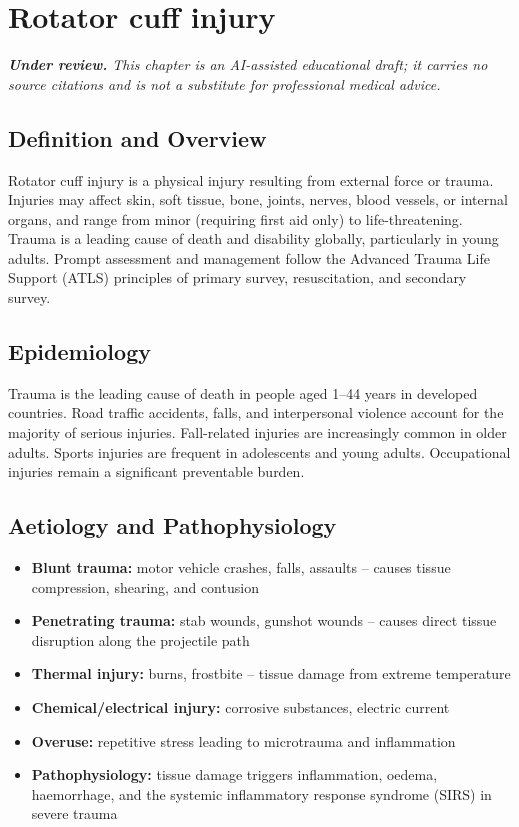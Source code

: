 \chapter{Rotator cuff injury}

\medskip
\noindent\textit{\textbf{Under review.} This chapter is an AI-assisted educational draft; it carries no source citations and is not a substitute for professional medical advice.}

\section*{Definition and Overview}
Rotator cuff injury is a physical injury resulting from external force or trauma. Injuries may affect skin, soft tissue, bone, joints, nerves, blood vessels, or internal organs, and range from minor (requiring first aid only) to life-threatening. Trauma is a leading cause of death and disability globally, particularly in young adults. Prompt assessment and management follow the Advanced Trauma Life Support (ATLS) principles of primary survey, resuscitation, and secondary survey.

\section*{Epidemiology}
Trauma is the leading cause of death in people aged 1--44 years in developed countries. Road traffic accidents, falls, and interpersonal violence account for the majority of serious injuries. Fall-related injuries are increasingly common in older adults. Sports injuries are frequent in adolescents and young adults. Occupational injuries remain a significant preventable burden.

\section*{Aetiology and Pathophysiology}
\begin{itemize}
    \item \textbf{Blunt trauma:} motor vehicle crashes, falls, assaults -- causes tissue compression, shearing, and contusion
    \item \textbf{Penetrating trauma:} stab wounds, gunshot wounds -- causes direct tissue disruption along the projectile path
    \item \textbf{Thermal injury:} burns, frostbite -- tissue damage from extreme temperature
    \item \textbf{Chemical/electrical injury:} corrosive substances, electric current
    \item \textbf{Overuse:} repetitive stress leading to microtrauma and inflammation
    \item \textbf{Pathophysiology:} tissue damage triggers inflammation, oedema, haemorrhage, and the systemic inflammatory response syndrome (SIRS) in severe trauma
\end{itemize}

